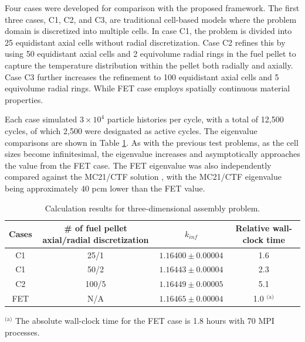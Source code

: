 Four cases were developed for comparison with the proposed framework. The first three cases, C1, C2, and C3, are traditional cell-based models where the problem domain is discretized into multiple cells. In case C1, the problem is divided into 25 equidistant axial cells without radial discretization. Case C2 refines this by using 50 equidistant axial cells and 2 equivolume radial rings in the fuel pellet to capture the temperature distribution within the pellet both radially and axially. Case C3 further increases the refinement to 100 equidistant axial cells and 5 equivolume radial rings. While FET case employs spatially continuous material properties.

Each case simulated $3 \times 10^4$ particle histories per cycle, with a total of 12,500 cycles, of which 2,500 were designated as active cycles. The eigenvalue comparisons are shown in Table \ref{tab31}. As with the previous test problems, as the cell sizes become infinitesimal, the eigenvalue increases and asymptotically approaches the value from the FET case. The FET eigenvalue was also independently compared against the MC21/CTF solution \cite{kelly_2017}, with the MC21/CTF eigenvalue being approximately 40 pcm lower than the FET value.

\begin{table}
    \centering
    \caption{Calculation results for three-dimensional assembly problem.}
    \label{tab31} 
    \begin{tabular}{| c | c | c | c | }
    \hline 
     Cases & \# of fuel pellet axial/radial discretization & $k_{inf}$ & Relative wall-clock time \\
     \hline
     C1     & 25/1  & $1.16400\pm0.00004$ & 1.6      \\ \hline
     C1     & 50/2  & $1.16443\pm0.00004$ & 2.3      \\ \hline
     C2     & 100/5 & $1.16449\pm0.00005$ & 5.1      \\ \hline
     FET    & N/A   & $1.16465\pm0.00004$ & 1.0 $^\text{(a)}$      \\ \hline
    \end{tabular}
    \begin{flushleft}
        \small
        $^\text{(a)}$ The absolute wall-clock time for the FET case is 1.8 hours with 70 MPI processes. \\
    \end{flushleft}
\end{table}

